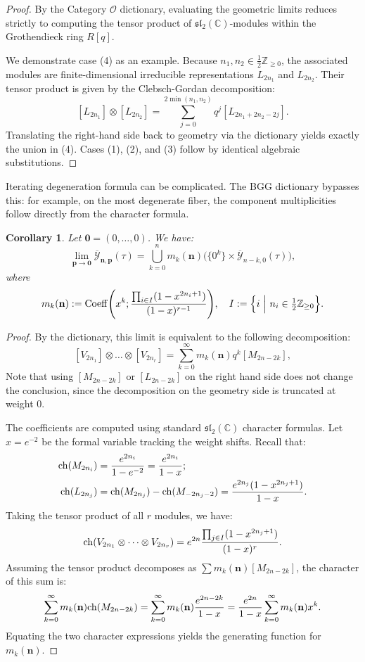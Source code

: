 \documentclass[11pt]{amsart}
\newtheorem{corollary}[theorem]{Corollary}
\theoremstyle{remark}
\numberwithin{equation}{section}
\begin{document}
\begin{proof}
By the Category $\mathcal{O}$ dictionary, evaluating the geometric limits reduces strictly to computing the tensor product of $\mathfrak{sl}_2(\mathbb{C})$-modules within the Grothendieck ring $R[q]$. 

We demonstrate case (4) as an example. Because $n_1, n_2 \in \frac{1}{2} \mathbb{Z}_{\geq 0}$, the associated modules are finite-dimensional irreducible representations $L_{2n_1}$ and $L_{2n_2}$. Their tensor product is given by the Clebsch-Gordan decomposition:
\[
    [L_{2n_1}] \otimes [L_{2n_2}] = \sum_{j=0}^{2\min(n_1,n_2)} q^j [L_{2n_1+2n_2-2j}].
\]
Translating the right-hand side back to geometry via the dictionary yields exactly the union in (4). Cases (1), (2), and (3) follow by identical algebraic substitutions.
\end{proof}

Iterating degeneration formula can be complicated. The BGG dictionary bypasses this: for example, on the most degenerate fiber, the component multiplicities follow directly from the character formula.
\begin{corollary} \label{Cor:special_fiber_p=0}
Let $\mathbf{0} = (0,\dots,0)$. We have:
\[
    \lim_{\mathbf{p} \to \mathbf{0}} \overline{\mathcal{Y}}_{\mathbf{n}, \mathbf{p}}(\tau) = \bigcup_{k=0}^{n}  m_k(\mathbf{n}) \Big( \{0^k\} \times  \overline{\mathcal{Y}}_{n-k, 0}(\tau) \Big),
\]  
where 
\[
    m_k(\mathbf{n}) := {\rm Coeff}\Bigg( x^k; \frac{ \prod_{i \in I} (1-x^{2n_i+1}) }{(1-x)^{r-1}} \Bigg), \quad I := \Big\{ i\ \Big| \ n_i \in \tfrac{1}{2}\mathbb{Z}_{\geq 0} \Big\}. 
\]
\end{corollary}

\begin{proof}
By the dictionary, this limit is equivalent to the following decomposition:
\[
    [V_{2n_1}]\otimes \dots \otimes [V_{2n_r}] = \sum_{k=0}^{\infty} m_k(\mathbf{n}) q^k [M_{2n-2k}],
\] 
Note that using $[M_{2n-2k}]$ or $[L_{2n-2k}]$ on the right hand side does not change the conclusion, since the decomposition on the geometry side is truncated at weight 0.

The coefficients are computed using standard $\mathfrak{sl}_2(\mathbb{C})$ character formulas. Let $x = e^{-2}$ be the formal variable tracking the weight shifts. Recall that:
\[
\begin{split}
    {\rm ch}(M_{2n_i}) &= \frac{e^{2n_i}}{1 - e^{-2}} = \frac{e^{2n_i}}{1 - x};
    \\
    {\rm ch}(L_{2n_j}) &= {\rm ch}(M_{2n_j}) - {\rm ch}(M_{-2n_j-2}) = \frac{e^{2n_j}(1 - x^{2n_j+1})}{1 - x}.
\end{split}
\]
Taking the tensor product of all $r$ modules, we have:
\[
    {\rm ch}(V_{2n_1} \otimes \dots \otimes V_{2n_r}) = e^{2n} \frac{\prod_{j \in I} (1 - x^{2n_j+1})}{(1 - x)^r}.
\]
Assuming the tensor product decomposes as $\sum m_k(\mathbf{n}) [M_{2n - 2k}]$, the character of this sum is:
\[
    \sum_{k=0}^{\infty} m_k(\mathbf{n}) {\rm ch}(M_{2n - 2k}) = \sum_{k=0}^{\infty} m_k(\mathbf{n}) \frac{e^{2n - 2k}}{1 - x} = \frac{e^{2n}}{1 - x} \sum_{k=0}^{\infty} m_k(\mathbf{n}) x^k.
\]
Equating the two character expressions yields the generating function for $m_k(\mathbf{n})$. 
\end{proof}
\end{document}
